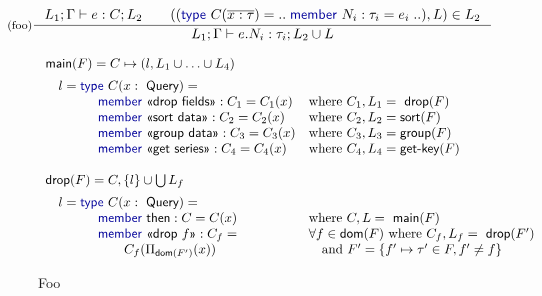 \documentclass[a4paper,UKenglish]{lipics-v2016}
\newcommand{\kvd}[1]{\textnormal{\textcolor{kvdclr}{\sffamily #1}}}
\newcommand{\ident}[1]{\textnormal{\sffamily #1}}
\newcommand{\qident}[1]{\textnormal{\sffamily \guillemotleft #1\guillemotright}}
\newcommand{\dom}{\ident{dom}}
\begin{document}
\begin{equation*}
\inference[(foo)]
  {L_1; \Gamma \vdash e : C; L_2 \qquad ((\kvd{type}~C(\overline{x:\tau}) = ..\;\kvd{member}~N_i : \tau_i = e_i\;..), L) \in L_2}
  {L_1; \Gamma \vdash e.N_i:\tau_i; L_2 \cup L}
\end{equation*}

\newpage


\begin{figure}
\begin{equation*}
\begin{array}{ll}
\ident{main}(F) = C \mapsto (l, L_1 \cup \ldots \cup L_4)\\[0.5em]
\quad l = \kvd{type}~C(x:\ident{Query}) = \\
\qquad \qquad \kvd{member}~\qident{drop fields} : C_1 = C_1(x) &\textnormal{where}~C_1, L_1 = \ident{drop}(F)\\
\qquad \qquad \kvd{member}~\qident{sort data} : C_2 = C_2(x) &\textnormal{where}~C_2, L_2 = \ident{sort}(F)\\
\qquad \qquad \kvd{member}~\qident{group data} : C_3 = C_3(x) &\textnormal{where}~C_3, L_3 = \ident{group}(F)\\
\qquad \qquad \kvd{member}~\qident{get series} : C_4 = C_4(x) &\textnormal{where}~C_4, L_4 = \ident{get-key}(F)\\
\\
\ident{drop}(F) = C, \{l\} \cup \bigcup L_f\\[0.5em]
\quad l = \kvd{type}~C(x:\ident{Query}) = \\
\qquad \qquad \kvd{member}~\ident{then} : C = C(x)                 &\textnormal{where}~C, L = \ident{main}(F)\\
\qquad \qquad \kvd{member}~\qident{drop $f$} : C_f = &\forall f \in \dom(F)~\textnormal{where}~C_f, L_f = \ident{drop}(F')\\
\qquad \qquad \qquad  C_f(\Pi_{\ident{dom}(F')}(x))& \quad\textnormal{and}~ F' = \{ f'\mapsto\tau'\in F, f' \neq f\}\\
\end{array}
\end{equation*}

\caption{Foo}
\label{fig:foo}
\end{figure}
\end{document}
